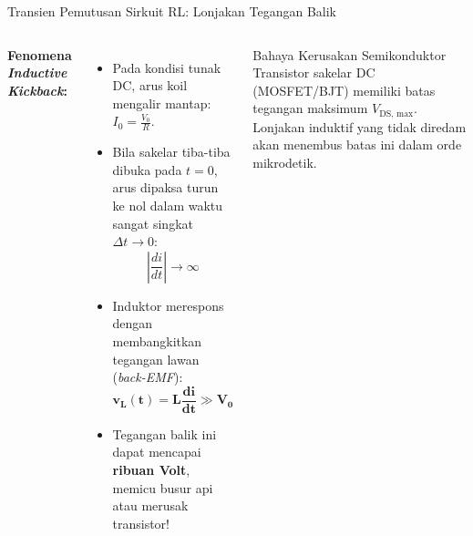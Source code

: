 \documentclass[aspectratio=169,10pt]{beamer}
\begin{document}
\begin{frame}{Transien Pemutusan Sirkuit RL: Lonjakan Tegangan Balik}
  \begin{columns}[c]
    \textbf{Fenomena \textit{Inductive Kickback}:}
    \begin{itemize}
      \item Pada kondisi tunak DC, arus koil mengalir mantap: $I_0 = \frac{V_0}{R}$.
      \item Bila sakelar tiba-tiba dibuka pada $t=0$, arus dipaksa turun ke nol dalam waktu sangat singkat $\Delta t \to 0$:
      \begin{equation*}
        \left| \frac{di}{dt} \right| \to \infty
      \end{equation*}
      \item Induktor merespons dengan membangkitkan tegangan lawan (\textit{back-EMF}):
      \begin{equation*}
        \mathbf{v_L(t) = L \frac{di}{dt} \gg V_0}
      \end{equation*}
      \item Tegangan balik ini dapat mencapai \textbf{ribuan Volt}, memicu busur api atau merusak transistor!
    \end{itemize}

    \begin{alertblock}{Bahaya Kerusakan Semikonduktor}
      Transistor sakelar DC (MOSFET/BJT) memiliki batas tegangan maksimum $V_{\text{DS, max}}$. Lonjakan induktif yang tidak diredam akan menembus batas ini dalam orde mikrodetik.
    \end{alertblock}
  \end{columns}
\end{frame}
\end{document}
